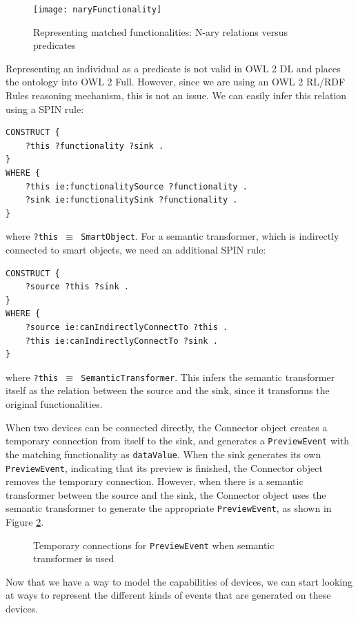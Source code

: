 \begin{figure}[bth]
        \texttt{[image: naryFunctionality]}
        \caption{Representing matched functionalities: N-ary relations versus predicates}
        \label{naryFunctionality}
\end{figure}

Representing an individual as a predicate is not valid in OWL 2 DL and places the ontology into OWL 2 Full. However, since we are using an OWL 2 RL/RDF Rules reasoning mechanism, this is not an issue. We can easily infer this relation using a \ac{SPIN} rule:

\begin{verbatim}
CONSTRUCT {
    ?this ?functionality ?sink .
}
WHERE {
    ?this ie:functionalitySource ?functionality .
    ?sink ie:functionalitySink ?functionality .
}
\end{verbatim}

where \texttt{?this \ensuremath{\equiv} SmartObject}. For a semantic transformer, which is indirectly connected to smart objects, we need an additional \ac{SPIN} rule:

\begin{verbatim}
CONSTRUCT {
    ?source ?this ?sink .
}
WHERE {
    ?source ie:canIndirectlyConnectTo ?this .
    ?this ie:canIndirectlyConnectTo ?sink .
}
\end{verbatim}

where \texttt{?this \ensuremath{\equiv} SemanticTransformer}. This infers the semantic transformer itself as the relation between the source and the sink, since it transforms the original functionalities.

When two devices can be connected directly, the Connector object creates a temporary connection from itself to the sink, and generates a \texttt{PreviewEvent} with the matching functionality as \texttt{dataValue}. When the sink generates its own \texttt{PreviewEvent}, indicating that its preview is finished, the Connector object removes the temporary connection. However, when there is a semantic transformer between the source and the sink, the Connector object uses the semantic transformer to generate the appropriate \texttt{PreviewEvent}, as shown in Figure \ref{stPreview}.

\begin{figure}[bth]
	\caption{Temporary connections for \texttt{PreviewEvent} when semantic transformer is used}
	\label{stPreview}        
\end{figure}

Now that we have a way to model the capabilities of devices, we can start looking at ways to represent the different kinds of events that are generated on these devices.
